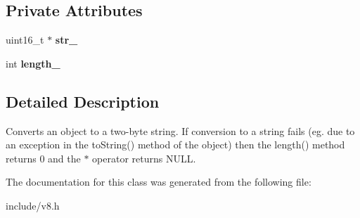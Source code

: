 \subsection*{Private Attributes}
\begin{DoxyCompactItemize}
\item 
uint16\+\_\+t $\ast$ {\bfseries str\+\_\+}\hypertarget{classv8_1_1_string_1_1_value_ac929f3bce35eb780a6f50ae0e8e286da}{}\label{classv8_1_1_string_1_1_value_ac929f3bce35eb780a6f50ae0e8e286da}

\item 
int {\bfseries length\+\_\+}\hypertarget{classv8_1_1_string_1_1_value_a616a68e7b525605cb2325990d660c900}{}\label{classv8_1_1_string_1_1_value_a616a68e7b525605cb2325990d660c900}

\end{DoxyCompactItemize}


\subsection{Detailed Description}
Converts an object to a two-\/byte string. If conversion to a string fails (eg. due to an exception in the to\+String() method of the object) then the length() method returns 0 and the $\ast$ operator returns N\+U\+LL. 

The documentation for this class was generated from the following file\+:\begin{DoxyCompactItemize}
\item 
include/v8.\+h\end{DoxyCompactItemize}
